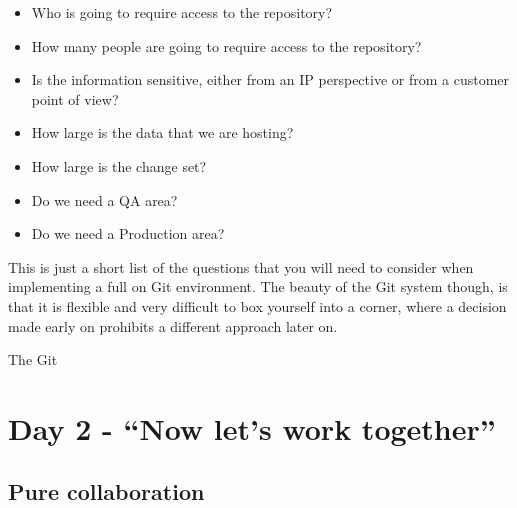 \begin{itemize}
\item Who is going to require access to the repository?
\item How many people are going to require access to the repository?
\item Is the information sensitive, either from an IP perspective or from a customer point of view?
\item How large is the data that we are hosting?
\item How large is the change set?
\item Do we need a QA area?
\item Do we need a Production area?
\end{itemize}

This is just a short list of the questions that you will need to consider when implementing a full on Git environment.  The beauty of the Git system though, is that it is flexible and very difficult to box yourself into a corner, where a decision made early on prohibits a different approach later on.

The Git

\section{Day 2 - ``Now let's work together''}
\subsection{Pure collaboration}


